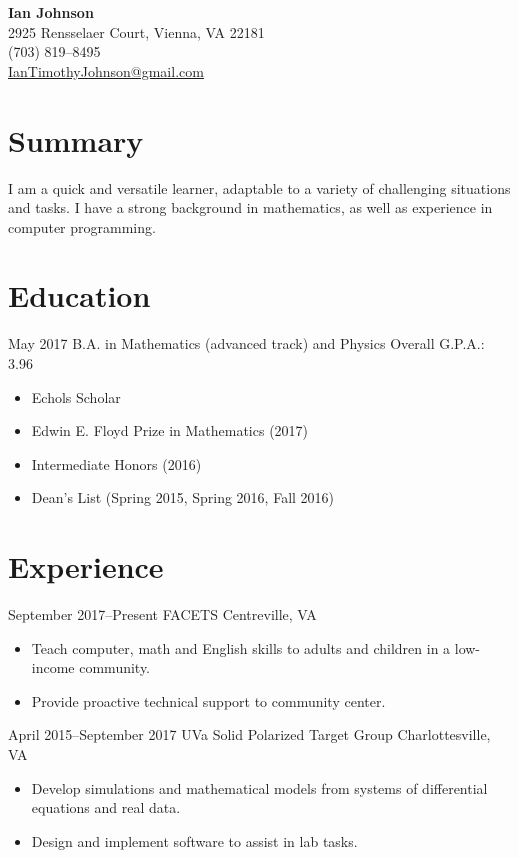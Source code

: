 \documentclass[10pt]{article}
\begin{document}
\begin{center}
  {\Large\bfseries Ian Johnson} \\
  2925 Rensselaer Court, Vienna, VA 22181 \\
  (703) 819--8495 \\
  \href{mailto:IanTimothyJohnson@gmail.com}{IanTimothyJohnson@gmail.com}
\end{center}

\section*{Summary}
I am a quick and versatile learner, adaptable to a variety of challenging
situations and tasks.  I have a strong background in mathematics, as well as
experience in computer programming.

\section*{Education}
{May 2017}
{B.A. in Mathematics (advanced track) and Physics}
{Overall G.P.A.: 3.96}
\begin{itemize}
\item Echols Scholar
\item Edwin E. Floyd Prize in Mathematics (2017)
\item Intermediate Honors (2016)
\item Dean's List (Spring 2015, Spring 2016, Fall 2016)
\end{itemize}

\section*{Experience}
{September 2017--Present}
{FACETS}
{Centreville, VA}
\begin{itemize}
\item Teach computer, math and English skills to adults and children
  in a low-income community.
\item Provide proactive technical support to community center.
\end{itemize}

{April 2015--September 2017}
{UVa Solid Polarized Target Group}
{Charlottesville, VA}
\begin{itemize}
\item Develop simulations and mathematical models from systems of
  differential equations and real data.
\item Design and implement software to assist in lab tasks.
\end{itemize}
\end{document}
